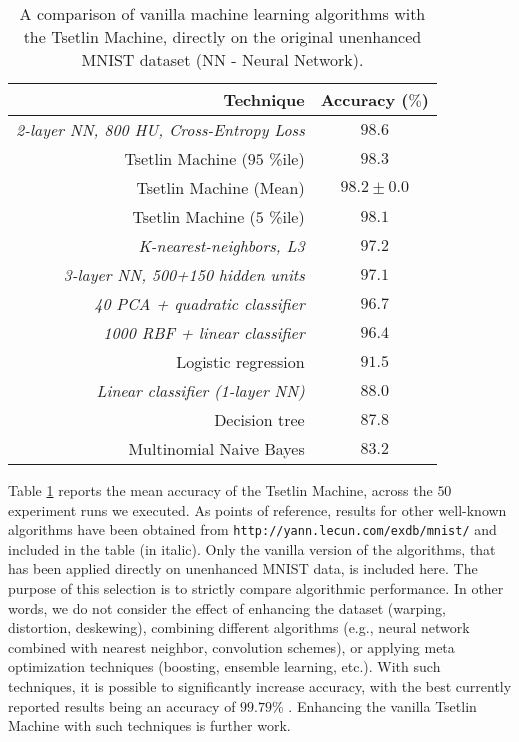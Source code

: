 \documentclass[11pt,a4paper]{article}
\begin{document}
\begin{table}[!bh]
    \centering
    \begin{tabular}{r||c}
        \bf Technique&\bf Accuracy ($\%$)\\
        \hline
        {\it 2-layer NN, 800 HU, Cross-Entropy Loss}&$\mathit{98.6}$\\
        Tsetlin Machine ($95$ \%ile)&$98.3$\\
        Tsetlin Machine (Mean)&$98.2 \pm 0.0$\\
        Tsetlin Machine ($5$ \%ile)&$98.1$\\
        {\it K-nearest-neighbors, L3}&$\mathit{97.2}$\\
        {\it 3-layer NN, 500+150 hidden units}&$\mathit{97.1}$\\
        {\it 40 PCA + quadratic classifier}&$\mathit{96.7}$\\
        {\it 1000 RBF + linear classifier}&$\mathit{96.4}$\\
        Logistic regression&$91.5$\\
        {\it Linear classifier (1-layer NN)}&$\mathit{88.0}$\\
        Decision tree&$87.8$\\
        Multinomial Naive Bayes&$83.2$
    \end{tabular}
    \caption{A comparison of vanilla machine learning algorithms with the Tsetlin Machine, directly on the original unenhanced MNIST dataset (NN - Neural Network). }
    \label{tab:MNIST_comparison}
\end{table}

Table \ref{tab:MNIST_comparison} reports the mean accuracy of the Tsetlin Machine, across the $50$ experiment runs we executed. As points of reference, results for other well-known algorithms have been obtained from {\tt http://yann.lecun.com/exdb/mnist/} and included in the table (in italic). Only the vanilla version of the algorithms, that has been applied directly on unenhanced MNIST data, is included here. The purpose of this selection is to strictly compare algorithmic performance. In other words, we do not consider the effect of enhancing the dataset (warping, distortion, deskewing), combining different algorithms (e.g., neural network combined with nearest neighbor, convolution schemes), or applying meta optimization techniques (boosting, ensemble learning, etc.). With such techniques, it is possible to significantly increase accuracy, with the best currently reported results being an accuracy of $99.79$\% \cite{Wan2013}. Enhancing the vanilla Tsetlin Machine with such techniques is further work.
\end{document}
